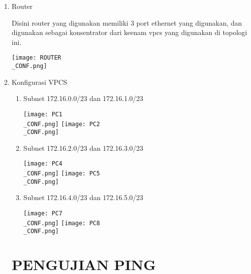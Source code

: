 \documentclass[12pt, a4paper]{article}
\begin{document}
  \begin{enumerate}
    \item Router

      Disini router yang digunakan memiliki 3 port ethernet yang digunakan,
      dan digunakan sebagai konsentrator dari keenam vpcs yang digunakan di
      topologi ini.

      \begin{center}
        \texttt{[image: ROUTER\\\_CONF.png]}
      \end{center}

    \newpage
    \item Konfigurasi VPCS

      \begin{enumerate}
        \item Subnet 172.16.0.0/23 dan 172.16.1.0/23

          \begin{multicols}{2}
              \texttt{[image: PC1\\\_CONF.png]}
              \columnbreak
              \texttt{[image: PC2\\\_CONF.png]}
          \end{multicols}

        \item Subnet 172.16.2.0/23 dan 172.16.3.0/23

          \begin{multicols}{2}
              \texttt{[image: PC4\\\_CONF.png]}
              \columnbreak
              \texttt{[image: PC5\\\_CONF.png]}
          \end{multicols}

        \item Subnet 172.16.4.0/23 dan 172.16.5.0/23

          \begin{multicols}{2}
              \texttt{[image: PC7\\\_CONF.png]}
              \columnbreak
              \texttt{[image: PC8\\\_CONF.png]}
          \end{multicols}

      \end{enumerate}

    \newpage

    \begin{center}
      \section*{PENGUJIAN PING}
    \end{center}


\end{enumerate}
\end{document}
